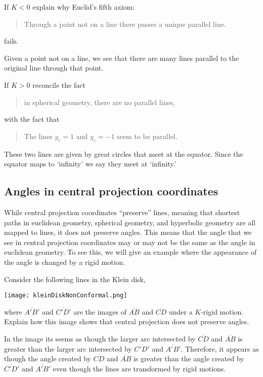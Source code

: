 \documentclass[newpage,hints,12pt,noauthor,handout,nooutcomes]{ximera}
\begin{document}
\begin{problem}
  If $K<0$ explain why Euclid's fifth axiom:
  \begin{quote}
    Through a point not on a line there passes a unique parallel line.
  \end{quote}
  fails.
  \begin{freeResponse}
    Given a point not on a line, we see that there are many lines
    parallel to the original line through that point.
  \end{freeResponse}
\end{problem}

\begin{problem}
  If $K>0$ reconcile the fact
  \begin{quote}
    in spherical geometry, there are no parallel lines,
  \end{quote}
  with the fact that 
  \begin{quote}
    The lines $y_c=1$ and $y_c = -1$ seem to be parallel.
  \end{quote}
  \begin{freeResponse}
    These two lines are given by great circles that meet at the
    equator. Since the equator maps to `infinity' we say they meet at
    `infinity.'
  \end{freeResponse}
\end{problem}

\subsection{Angles in central projection coordinates}

While central projection coordinates ``preserve'' lines, meaning that
shortest paths in euclidean geometry, spherical geometry, and
hyperbolic geometry are all mapped to lines, it does not preserve
angles. This means that the angle that we see in central projection
coordinates may or may not be the same as the angle in euclidean
geometry. To see this, we will give an example where the appearance of
the angle is changed by a rigid motion.


\begin{problem}
  Consider the following lines in the Klein disk,
  \begin{image}
    \texttt{[image: kleinDiskNonConformal.png]}
  \end{image}
  where $\overline{A'B'}$ and $\overline{C'D'}$ are the images of
  $\overline{AB}$ and $\overline{CD}$ under a $K$-rigid
  motion. Explain how this image shows that central projection does
  not preserve angles.
  
  \begin{freeResponse}
  In the image its seems as though the larger arc intersected by $\overline{CD}$ and $\overline{AB}$ is greater than the larger arc intersected by $\overline{C'D'}$ and $\overline{A'B'}$. Therefore, it appears as though the angle created by $\overline{CD}$ and $\overline{AB}$ is greater than the angle created by $\overline{C'D'}$ and $\overline{A'B'}$ even though the lines are transformed by rigid motions. 
  \end{freeResponse}
\end{problem}
\end{document}
